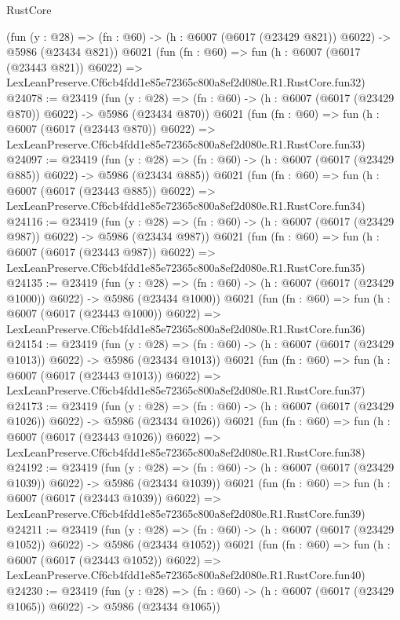 \begin{lexlean}{RustCore}
\begin{coremodule}
    (fun (y : @28) => (fn : @60) -> (h : @6007 (@6017 (@23429 @821)) @6022) -> @5986 (@23434 @821))
    @6021
    (fun (fn : @60) =>
    fun (h : @6007 (@6017 (@23443 @821)) @6022) =>
    LexLeanPreserve.Cf6cb4fdd1e85e72365c800a8ef2d080e.R1.RustCore.fun32)
@24078 := @23419
    (fun (y : @28) => (fn : @60) -> (h : @6007 (@6017 (@23429 @870)) @6022) -> @5986 (@23434 @870))
    @6021
    (fun (fn : @60) =>
    fun (h : @6007 (@6017 (@23443 @870)) @6022) =>
    LexLeanPreserve.Cf6cb4fdd1e85e72365c800a8ef2d080e.R1.RustCore.fun33)
@24097 := @23419
    (fun (y : @28) => (fn : @60) -> (h : @6007 (@6017 (@23429 @885)) @6022) -> @5986 (@23434 @885))
    @6021
    (fun (fn : @60) =>
    fun (h : @6007 (@6017 (@23443 @885)) @6022) =>
    LexLeanPreserve.Cf6cb4fdd1e85e72365c800a8ef2d080e.R1.RustCore.fun34)
@24116 := @23419
    (fun (y : @28) => (fn : @60) -> (h : @6007 (@6017 (@23429 @987)) @6022) -> @5986 (@23434 @987))
    @6021
    (fun (fn : @60) =>
    fun (h : @6007 (@6017 (@23443 @987)) @6022) =>
    LexLeanPreserve.Cf6cb4fdd1e85e72365c800a8ef2d080e.R1.RustCore.fun35)
@24135 := @23419
    (fun (y : @28) =>
    (fn : @60) -> (h : @6007 (@6017 (@23429 @1000)) @6022) -> @5986 (@23434 @1000))
    @6021
    (fun (fn : @60) =>
    fun (h : @6007 (@6017 (@23443 @1000)) @6022) =>
    LexLeanPreserve.Cf6cb4fdd1e85e72365c800a8ef2d080e.R1.RustCore.fun36)
@24154 := @23419
    (fun (y : @28) =>
    (fn : @60) -> (h : @6007 (@6017 (@23429 @1013)) @6022) -> @5986 (@23434 @1013))
    @6021
    (fun (fn : @60) =>
    fun (h : @6007 (@6017 (@23443 @1013)) @6022) =>
    LexLeanPreserve.Cf6cb4fdd1e85e72365c800a8ef2d080e.R1.RustCore.fun37)
@24173 := @23419
    (fun (y : @28) =>
    (fn : @60) -> (h : @6007 (@6017 (@23429 @1026)) @6022) -> @5986 (@23434 @1026))
    @6021
    (fun (fn : @60) =>
    fun (h : @6007 (@6017 (@23443 @1026)) @6022) =>
    LexLeanPreserve.Cf6cb4fdd1e85e72365c800a8ef2d080e.R1.RustCore.fun38)
@24192 := @23419
    (fun (y : @28) =>
    (fn : @60) -> (h : @6007 (@6017 (@23429 @1039)) @6022) -> @5986 (@23434 @1039))
    @6021
    (fun (fn : @60) =>
    fun (h : @6007 (@6017 (@23443 @1039)) @6022) =>
    LexLeanPreserve.Cf6cb4fdd1e85e72365c800a8ef2d080e.R1.RustCore.fun39)
@24211 := @23419
    (fun (y : @28) =>
    (fn : @60) -> (h : @6007 (@6017 (@23429 @1052)) @6022) -> @5986 (@23434 @1052))
    @6021
    (fun (fn : @60) =>
    fun (h : @6007 (@6017 (@23443 @1052)) @6022) =>
    LexLeanPreserve.Cf6cb4fdd1e85e72365c800a8ef2d080e.R1.RustCore.fun40)
@24230 := @23419
    (fun (y : @28) =>
    (fn : @60) -> (h : @6007 (@6017 (@23429 @1065)) @6022) -> @5986 (@23434 @1065))

\end{coremodule}
\end{lexlean}
